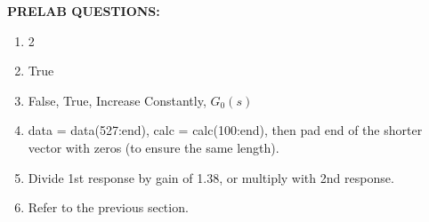 \documentclass[11pt,a4paper]{article}
\begin{document}
\pagebreak
\textbf{PRELAB QUESTIONS:}
\begin{enumerate}
	\item 2
	\item True
	\item False, True, Increase Constantly, $G_0(s)$
	\item data = data(527:end), calc = calc(100:end), then pad end of the shorter vector with zeros (to ensure the same length).
	\item Divide 1st response by gain of 1.38, or multiply with 2nd response. 
	\item Refer to the previous section. 
\end{enumerate}





\pagebreak
\end{document}
